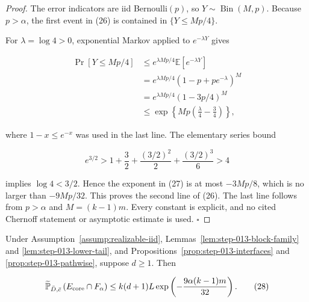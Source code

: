 \begin{proof}
The error indicators are iid Bernoulli\((p)\), so
\(Y\sim\operatorname{Bin}(M,p)\). Because \(p>\alpha\), the first event in
(26) is contained in \(\{Y\leq Mp/4\}\).

For \(\lambda=\log4>0\), exponential Markov applied to
\(e^{-\lambda Y}\) gives

\[
\begin{aligned}
 \Pr[Y\leq Mp/4]
 &\leq e^{\lambda Mp/4}\mathbb E[e^{-\lambda Y}]\\
 &=e^{\lambda Mp/4}(1-p+pe^{-\lambda})^M\\
 &=e^{\lambda Mp/4}(1-3p/4)^M\\
 &\leq\exp\left\{Mp\left(\frac{\lambda}{4}-\frac34\right)\right\},
\end{aligned}
 \tag{27}
\]

where \(1-x\leq e^{-x}\) was used in the last line. The elementary series
bound

\[
 e^{3/2}>1+\frac32+\frac{(3/2)^2}{2}
              +\frac{(3/2)^3}{6}>4
\]

implies \(\log4<3/2\). Hence the exponent in (27) is at most
\(-3Mp/8\), which is no larger than \(-9Mp/32\). This proves the second
line of (26). The last line follows from \(p>\alpha\) and
\(M=(k-1)m\). Every constant is explicit, and no cited Chernoff statement
or asymptotic estimate is used. \(\square\)


\end{proof}

\begin{proposition}\label{prop:step-013-finite-integration}
Under Assumption~\ref{assump:realizable-iid},
Lemmas~\ref{lem:step-013-block-family} and
\ref{lem:step-013-lower-tail}, and
Propositions~\ref{prop:step-013-interfaces} and
\ref{prop:step-013-pathwise}, suppose \(d\geq1\). Then

\[
 \widetilde{\mathbb P}_{\bar D,\bar c}
 \left(E_{\rm core}\cap F_\alpha\right)
 \leq k(d+1)L
       \exp\left(-\frac{9\alpha(k-1)m}{32}\right).
 \tag{28}
\]


\end{proposition}

